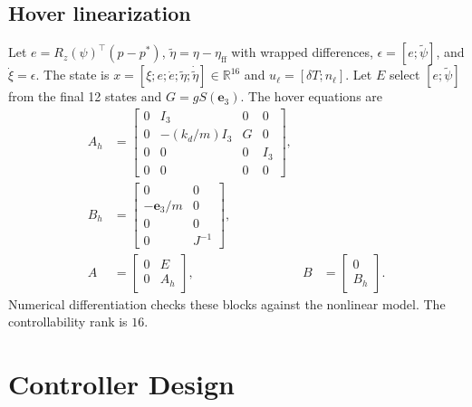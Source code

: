 \documentclass[conference]{IEEEtran}
\newcommand{\e}{\mathbf e_3}
\newcommand{\rr}{\mathbb R}
\begin{document}
\clearpage
\subsection{Hover linearization}
Let \(e=R_z(\psi)^\top(p-p^\ast)\),
\(\tilde\eta=\eta-\eta_{\mathrm{ff}}\) with wrapped differences,
\(\epsilon=[e;\tilde\psi]\), and \(\dot\xi=\epsilon\).
The state is \(x=[\xi;e;\dot e;\tilde\eta;\dot{\tilde\eta}]
\in\rr^{16}\) and \(u_\ell=[\delta T;n_\ell]\).
Let \(E\) select \([e;\tilde\psi]\) from the final 12 states
and \(G=gS(\e)\). The hover equations are
\begin{align}
A_h&=\begin{bmatrix}
0&I_3&0&0\\0&-(k_d/m)I_3&G&0\\0&0&0&I_3\\0&0&0&0
\end{bmatrix},\\
B_h&=\begin{bmatrix}0&0\\-\e/m&0\\0&0\\0&J^{-1}\end{bmatrix},\\
A&=\begin{bmatrix}0&E\\0&A_h\end{bmatrix},&
B&=\begin{bmatrix}0\\B_h\end{bmatrix}.
\end{align}
Numerical differentiation checks these blocks against the
nonlinear model. The controllability rank is \(16\).

\section{Controller Design}
\end{document}
